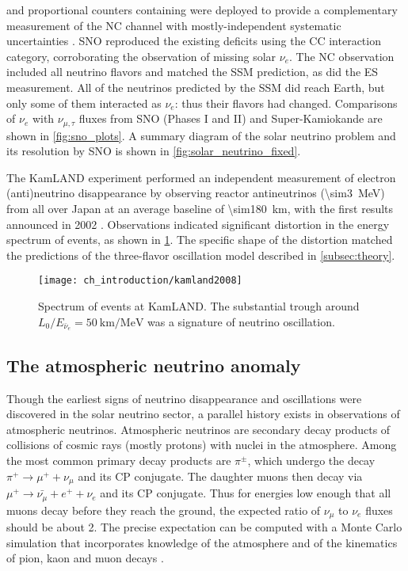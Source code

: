 and proportional counters containing 
were deployed to provide a complementary measurement of the NC channel
with mostly-independent systematic uncertainties \cite{sno_ncd_instrumentation}.
SNO reproduced the existing deficits using the CC interaction category,
corroborating the observation of missing solar $\nu_e$.
The NC observation included all neutrino flavors and matched the SSM prediction,
as did the ES measurement.
All of the neutrinos predicted by the SSM did reach Earth,
but only some of them interacted as $\nu_e$: thus their flavors had changed.
Comparisons of $\nu_e$ with $\nu_{\mu,\tau}$ fluxes
from SNO (Phases I and II) and Super-Kamiokande are shown in \cref{fig:sno_plots}.
A summary diagram of the solar neutrino problem and its resolution by SNO
is shown in \cref{fig:solar_neutrino_fixed}.

The KamLAND experiment performed
an independent measurement of electron (anti)\-neutrino disappearance
by observing reactor antineutrinos (\SI{\sim3}{\MeV}) from all over Japan
at an average baseline of \SI{\sim180}{\km},
with the first results announced in 2002 \cite{kamland_first}.
Observations indicated significant distortion
in the energy spectrum of \nuebar{} events,
as shown in \cref{fig:kamland_spec}.
The specific shape of the distortion
matched the predictions of the three-flavor oscillation model
described in \cref{subsec:theory}.

\begin{figure}
    \centering
    \texttt{[image: ch\_introduction/kamland2008]}
    \caption[KamLAND oscillation spectrum]{
        Spectrum of \nuebar{} events at KamLAND.
        The substantial trough around $L_0/E_{\bar{\nu}_e} = \SI{50}{\km\per\MeV}$
        was a signature of neutrino oscillation.
    }
    \label{fig:kamland_spec}
\end{figure}

\subsection{The atmospheric neutrino anomaly}
\label{subsec:atmospheric_anomaly}

Though the earliest signs of neutrino disappearance and oscillations
were discovered in the solar neutrino sector,
a parallel history exists in observations of atmospheric neutrinos.
Atmospheric neutrinos are secondary decay products of
collisions of cosmic rays (mostly protons) with nuclei in the atmosphere.
Among the most common primary decay products are $\pi^{\pm}$,
which undergo the decay $\pi^+ \to \mu^+ + \nu_\mu$ and its CP conjugate.
The daughter muons then decay via $\mu^+ \to \bar{\nu_\mu} + e^+ + \nu_e$
and its CP conjugate.
Thus for energies low enough that all muons decay before they reach the ground,
the expected ratio of $\nu_\mu$ to $\nu_e$ fluxes should be about 2.
The precise expectation can be computed with a Monte Carlo simulation
that incorporates knowledge of the atmosphere and of the kinematics of
pion, kaon and muon decays \cite{neutrino_textbook}.

